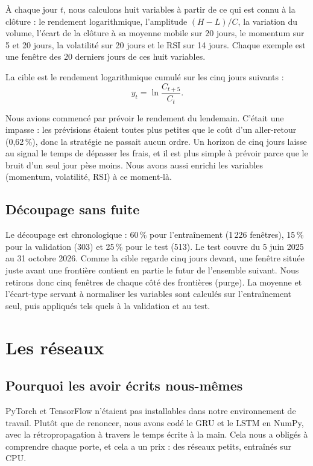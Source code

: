 \documentclass[11pt,a4paper]{article}
\begin{document}
À chaque jour $t$, nous calculons huit variables à partir de ce qui est connu à la clôture : le rendement logarithmique, l'amplitude
$(H-L)/C$, la variation du volume, l'écart de la clôture à sa moyenne mobile sur 20 jours, le momentum sur 5 et 20 jours, la volatilité sur
20 jours et le RSI sur 14 jours. Chaque exemple est une fenêtre des 20 derniers jours de ces huit variables.

La cible est le rendement logarithmique cumulé sur les cinq jours suivants :
\[
y_t=\ln\frac{C_{t+5}}{C_t}.
\]

Nous avions commencé par prévoir le rendement du lendemain. C'était une impasse : les prévisions étaient toutes plus petites que le coût d'un
aller-retour (0,62\,\%), donc la stratégie ne passait aucun ordre. Un horizon de cinq jours laisse au signal le temps de dépasser les frais, et il est
plus simple à prévoir parce que le bruit d'un seul jour pèse moins. Nous avons aussi enrichi les variables (momentum, volatilité, RSI) à ce moment-là.

\subsection{Découpage sans fuite}

Le découpage est chronologique : 60\,\% pour l'entraînement (1\,226 fenêtres), 15\,\% pour la validation (303) et 25\,\% pour le test (513).
Le test couvre du 5 juin 2025 au 31 octobre 2026. Comme la cible regarde cinq jours devant, une fenêtre située juste avant une frontière contient en
partie le futur de l'ensemble suivant. Nous retirons donc cinq fenêtres de chaque côté des frontières (purge). La moyenne et l'écart-type servant à
normaliser les variables sont calculés sur l'entraînement seul, puis appliqués tels quels à la validation et au test.

\section{Les réseaux}\label{sec:modeles}

\subsection{Pourquoi les avoir écrits nous-mêmes}

PyTorch et TensorFlow n'étaient pas installables dans notre environnement de travail. Plutôt que de renoncer, nous avons codé le GRU et le LSTM en
NumPy, avec la rétropropagation à travers le temps écrite à la main. Cela nous a obligés à comprendre chaque porte, et cela a un prix : des
réseaux petits, entraînés sur CPU.
\end{document}
